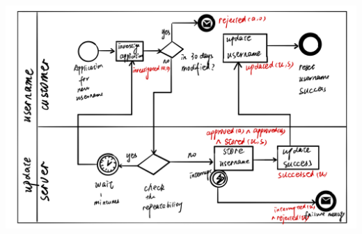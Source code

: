 \documentclass[11pt]{article}
\begin{document}
\begin{enumerate}
\includegraphics[scale=0.3]{Figure4-3.jpeg}


\end{enumerate}
\end{document}
